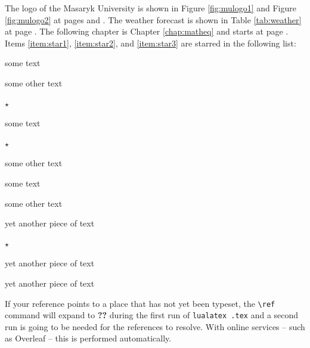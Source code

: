\documentclass[
  digital, %
  table,   %
  lof,     %
  lot,     %
]{fithesis3}
\begin{document}
The logo of the Masaryk University is shown in Figure
\ref{fig:mulogo1} and Figure \ref{fig:mulogo2} at pages
\pageref{fig:mulogo1} and \pageref{fig:mulogo2}. The weather
forecast is shown in Table \ref{tab:weather} at page
\pageref{tab:weather}. The following chapter is Chapter
\ref{chap:matheq} and starts at page \pageref{chap:matheq}.
Items \ref{item:star1}, \ref{item:star2}, and
\ref{item:star3} are starred in the following list:
\begin{compactenum}
  \item some text
  \item some other text
  \item $\star$ \label{item:star1}
  \begin{compactenum}
    \item some text
    \item $\star$ \label{item:star2}
    \item some other text
    \begin{compactenum}
      \item some text
      \item some other text
      \item yet another piece of text
      \item $\star$ \label{item:star3}
    \end{compactenum}
    \item yet another piece of text
  \end{compactenum}
  \item yet another piece of text
\end{compactenum}
If your reference points to a place that has not yet been typeset,
the \verb"\ref" command will expand to \textbf{??} during the first
run of
\texttt{lualatex \jobname.tex}
and a second run is going to be needed for the references to
resolve. With online services -- such as Overleaf -- this is
performed automatically.
\end{document}
